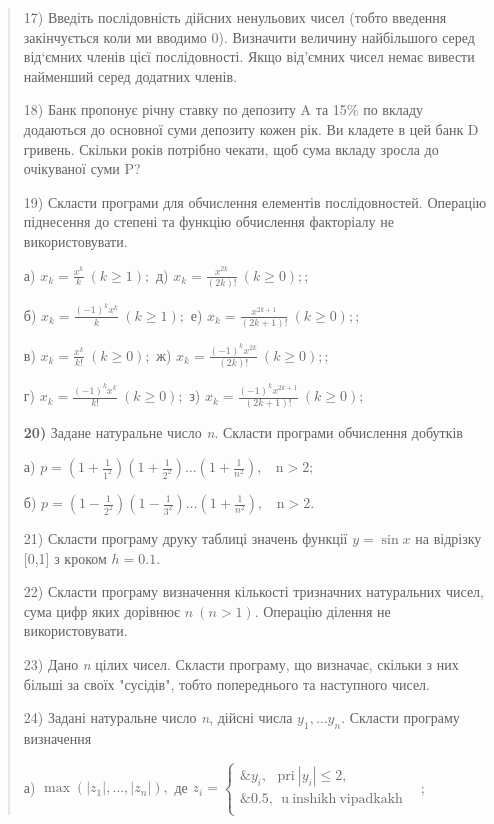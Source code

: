 \documentclass[]{article}
\begin{document}
\begin{quote}
17) Введіть послідовність дійсних ненульових чисел (тобто введення
закінчується коли ми вводимо 0). Визначити величину найбільшого серед
від`ємних членів цієї послідовності. Якщо від'ємних чисел немає вивести
найменший серед додатних членів.

18) Банк пропонує річну ставку по депозиту A та 15\% по вкладу додаються
до основної суми депозиту кожен рік. Ви кладете в цей банк D гривень.
Скільки років потрібно чекати, щоб сума вкладу зросла до очікуваної суми
P?

19) Скласти програми для обчислення елементів послідовностей. Операцію
піднесення до степені та функцію обчислення факторіалу не
використовувати.

а) \(x_{k} = \frac{x^{k}}{k}\ (k \geq 1);\) д)
\(x_{k} = \frac{x^{2k}}{(2k)!}\ (k \geq 0);\);

б) \(x_{k} = \frac{( - 1)^{k}x^{k}}{k}\ (k \geq 1);\) е)
\(x_{k} = \frac{x^{2k + 1}}{(2k + 1)!}\ (k \geq 0);\);

в) \(x_{k} = \frac{x^{k}}{k!}\ (k \geq 0);\) ж)
\(x_{k} = \frac{( - 1)^{k}x^{2k}}{(2k)!}\ (k \geq 0);\);

г) \(x_{k} = \frac{( - 1)^{k}x^{k}}{k!}\ (k \geq 0);\) з)
\(x_{k} = \frac{( - 1)^{k}x^{2k + 1}}{(2k + 1)!}\ (k \geq 0);\)

\textbf{20)} Задане натуральне число \emph{n}. Скласти програми
обчислення добутків

а)
\(p = \left( 1 + \frac{1}{1^{2}} \right)\left( 1 + \frac{1}{2^{2}} \right)\ldots\left( 1 + \frac{1}{n^{2}} \right),\mathrm{\ \ \ \ n > 2};\)

б)
\(p = \left( 1 - \frac{1}{2^{2}} \right)\left( 1 - \frac{1}{3^{2}} \right)\ldots\left( 1 + \frac{1}{n^{2}} \right),\mathrm{\ \ \ \ n > 2.}\)

21) Скласти програму друку таблиці значень функції \(y = \sin x\) на
відрізку {[}0,1{]} з кроком \(h = 0.1.\)

22) Скласти програму визначення кількості тризначних натуральних чисел,
сума цифр яких дорівнює \(n\ (n > 1).\) Операцію ділення не
використовувати.

23) Дано \emph{n} цілих чисел. Скласти програму, що визначає, скільки з
них більші за своїх "сусідів", тобто попереднього та наступного чисел.

24) Задані натуральне число \emph{n}, дійсні числа
\(y_{1},\ldots y_{n}.\) Скласти програму визначення

а) \(\max(\left| z_{1} \right|,\ldots,\left| z_{n} \right|),\) де
\(z_{i} = \left\{ \begin{matrix}
\& y_{i},\mathrm{\ \ \ pri\ }\left| y_{i} \right| \leq 2, \\
\& 0.5,\mathrm{\ \ u\ inshikh\ vipadkakh\ \ \ } \\
\end{matrix} \right.\ \);


\end{quote}
\end{document}
